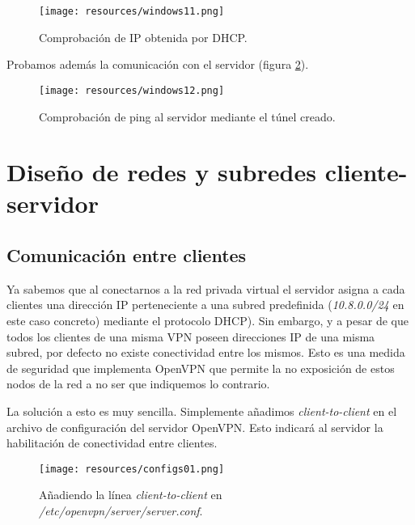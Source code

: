 \documentclass[a4paper, 11pt, titlepage]{article}
\begin{document}
        \begin{figure}[htp]
            \centering
            \texttt{[image: resources/windows11.png]}
            \caption{Comprobación de IP obtenida por DHCP.}
            \label{fig:windows11}
        \end{figure}  

        Probamos además la comunicación con el servidor (figura \ref{fig:windows12}).

        \begin{figure}[htp]
            \centering
            \texttt{[image: resources/windows12.png]}
            \caption{Comprobación de ping al servidor mediante el túnel creado.}
            \label{fig:windows12}
        \end{figure}  

\section{Diseño de redes y subredes cliente-servidor}

    \subsection{Comunicación entre clientes}

        Ya sabemos que al conectarnos a la red privada virtual el servidor asigna a cada 
        clientes una dirección IP perteneciente a una subred predefinida (\textit{10.8.0.0/24}
        en este caso concreto) mediante el protocolo DHCP). Sin embargo, y a pesar de que 
        todos los clientes de una misma VPN poseen direcciones IP de una misma subred, por 
        defecto no existe conectividad entre los mismos. Esto es una medida de seguridad
        que implementa OpenVPN que permite la no exposición de estos nodos de la red a no
        ser que indiquemos lo contrario. 

        La solución a esto es muy sencilla. Simplemente añadimos \textit{client-to-client}
        en el archivo de configuración del servidor OpenVPN. Esto indicará al servidor
        la habilitación de conectividad entre clientes.

        \begin{figure}[htp]
            \centering
            \texttt{[image: resources/configs01.png]}
            \caption{Añadiendo la línea \textit{client-to-client} en \textit{/etc/openvpn/server/server.conf}.}
            \label{}
        \end{figure}  
\end{document}
